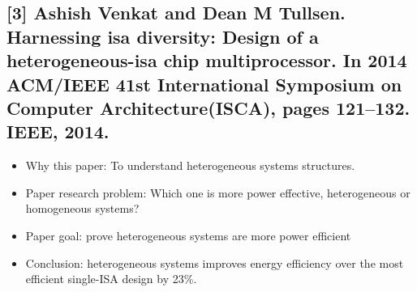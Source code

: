 \documentclass[twocolumn,11pt]{IEEEtran}
\begin{document}
    \subsection*{[3] Ashish Venkat and Dean M Tullsen. Harnessing isa diversity: Design  of  a  heterogeneous-isa  chip  multiprocessor. In 2014 ACM/IEEE 41st International Symposium on Computer Architecture(ISCA), pages 121–132. IEEE, 2014.}
    \begin{itemize}
        \item Why this paper: To understand heterogeneous systems structures.
        \item Paper research problem: Which one is more power effective, heterogeneous or homogeneous systems?
        \item Paper goal: prove heterogeneous systems are more power efficient
        \item Conclusion: heterogeneous systems improves energy efficiency over the most efficient single-ISA design by 23\%.
    \end{itemize} 
\end{document}

